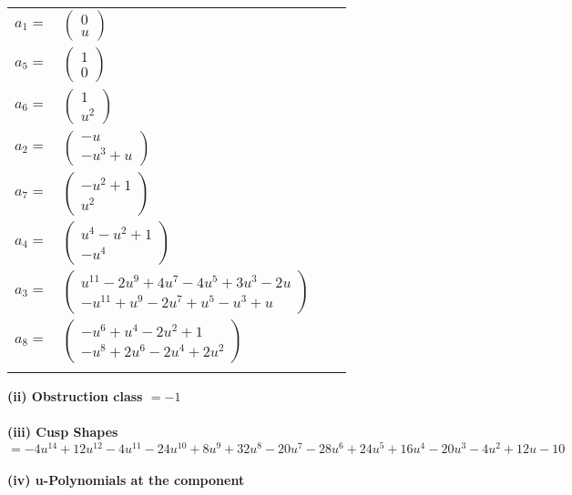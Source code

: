 \documentclass[1p]{elsarticle_modified}
\theoremstyle{definition}
\begin{document}
\begin{tabular}{m{7pt} m{180pt} m{7pt} m{180pt} }
\flushright $a_{1}=$&$\begin{pmatrix}0\\u\end{pmatrix}$ \\
\flushright $a_{5}=$&$\begin{pmatrix}1\\0\end{pmatrix}$ \\
\flushright $a_{6}=$&$\begin{pmatrix}1\\u^2\end{pmatrix}$ \\
\flushright $a_{2}=$&$\begin{pmatrix}- u\\- u^3+u\end{pmatrix}$ \\
\flushright $a_{7}=$&$\begin{pmatrix}- u^2+1\\u^2\end{pmatrix}$ \\
\flushright $a_{4}=$&$\begin{pmatrix}u^4- u^2+1\\- u^4\end{pmatrix}$ \\
\flushright $a_{3}=$&$\begin{pmatrix}u^{11}-2 u^9+4 u^7-4 u^5+3 u^3-2 u\\- u^{11}+u^9-2 u^7+u^5- u^3+u\end{pmatrix}$ \\
\flushright $a_{8}=$&$\begin{pmatrix}- u^6+u^4-2 u^2+1\\- u^8+2 u^6-2 u^4+2 u^2\end{pmatrix}$\\&\end{tabular}
\flushleft \textbf{(ii) Obstruction class $= -1$}\\~\\
\flushleft \textbf{(iii) Cusp Shapes $= -4 u^{14}+12 u^{12}-4 u^{11}-24 u^{10}+8 u^9+32 u^8-20 u^7-28 u^6+24 u^5+16 u^4-20 u^3-4 u^2+12 u-10$}\\~\\
\newpage\renewcommand{\arraystretch}{1}
\flushleft \textbf{(iv) u-Polynomials at the component}\newline \\
\end{document}
